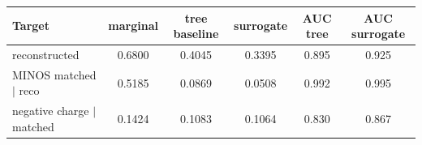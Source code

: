 \begin{tabular}{lccccc}
\toprule
Target & marginal & tree baseline & surrogate & AUC tree & AUC surrogate \\
\midrule
reconstructed & 0.6800 & 0.4045 & 0.3395 & 0.895 & 0.925 \\
MINOS matched $\mid$ reco & 0.5185 & 0.0869 & 0.0508 & 0.992 & 0.995 \\
negative charge $\mid$ matched & 0.1424 & 0.1083 & 0.1064 & 0.830 & 0.867 \\
\bottomrule
\end{tabular}
